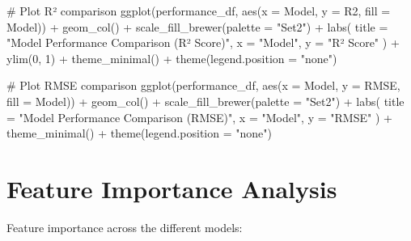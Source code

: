 \documentclass[
  letterpaper,
  DIV=11,
  numbers=noendperiod]{scrreprt}
\newenvironment{Shaded}{\begin{snugshade}}{\end{snugshade}}
\newcommand{\AttributeTok}[1]{\textcolor[rgb]{0.40,0.45,0.13}{#1}}
\newcommand{\CommentTok}[1]{\textcolor[rgb]{0.37,0.37,0.37}{#1}}
\newcommand{\DecValTok}[1]{\textcolor[rgb]{0.68,0.00,0.00}{#1}}
\newcommand{\FunctionTok}[1]{\textcolor[rgb]{0.28,0.35,0.67}{#1}}
\newcommand{\NormalTok}[1]{\textcolor[rgb]{0.00,0.23,0.31}{#1}}
\newcommand{\SpecialCharTok}[1]{\textcolor[rgb]{0.37,0.37,0.37}{#1}}
\newcommand{\StringTok}[1]{\textcolor[rgb]{0.13,0.47,0.30}{#1}}
\begin{document}
\begin{Shaded}
\begin{Highlighting}[]
\CommentTok{\# Plot R² comparison}
\FunctionTok{ggplot}\NormalTok{(performance\_df, }\FunctionTok{aes}\NormalTok{(}\AttributeTok{x =}\NormalTok{ Model, }\AttributeTok{y =}\NormalTok{ R2, }\AttributeTok{fill =}\NormalTok{ Model)) }\SpecialCharTok{+}
  \FunctionTok{geom\_col}\NormalTok{() }\SpecialCharTok{+}
  \FunctionTok{scale\_fill\_brewer}\NormalTok{(}\AttributeTok{palette =} \StringTok{"Set2"}\NormalTok{) }\SpecialCharTok{+}
  \FunctionTok{labs}\NormalTok{(}
    \AttributeTok{title =} \StringTok{"Model Performance Comparison (R² Score)"}\NormalTok{,}
    \AttributeTok{x =} \StringTok{"Model"}\NormalTok{,}
    \AttributeTok{y =} \StringTok{"R² Score"}
\NormalTok{  ) }\SpecialCharTok{+}
  \FunctionTok{ylim}\NormalTok{(}\DecValTok{0}\NormalTok{, }\DecValTok{1}\NormalTok{) }\SpecialCharTok{+}
  \FunctionTok{theme\_minimal}\NormalTok{() }\SpecialCharTok{+}
  \FunctionTok{theme}\NormalTok{(}\AttributeTok{legend.position =} \StringTok{"none"}\NormalTok{)}

\CommentTok{\# Plot RMSE comparison}
\FunctionTok{ggplot}\NormalTok{(performance\_df, }\FunctionTok{aes}\NormalTok{(}\AttributeTok{x =}\NormalTok{ Model, }\AttributeTok{y =}\NormalTok{ RMSE, }\AttributeTok{fill =}\NormalTok{ Model)) }\SpecialCharTok{+}
  \FunctionTok{geom\_col}\NormalTok{() }\SpecialCharTok{+}
  \FunctionTok{scale\_fill\_brewer}\NormalTok{(}\AttributeTok{palette =} \StringTok{"Set2"}\NormalTok{) }\SpecialCharTok{+}
  \FunctionTok{labs}\NormalTok{(}
    \AttributeTok{title =} \StringTok{"Model Performance Comparison (RMSE)"}\NormalTok{,}
    \AttributeTok{x =} \StringTok{"Model"}\NormalTok{,}
    \AttributeTok{y =} \StringTok{"RMSE"}
\NormalTok{  ) }\SpecialCharTok{+}
  \FunctionTok{theme\_minimal}\NormalTok{() }\SpecialCharTok{+}
  \FunctionTok{theme}\NormalTok{(}\AttributeTok{legend.position =} \StringTok{"none"}\NormalTok{)}
\end{Highlighting}
\end{Shaded}

\section{Feature Importance Analysis}\label{feature-importance-analysis}

Feature importance across the different models:
\end{document}
